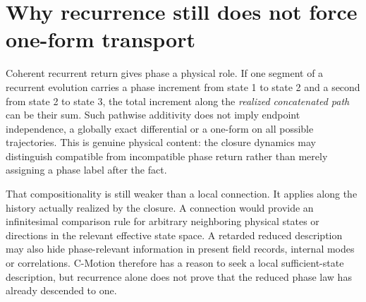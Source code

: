 \documentclass[11pt]{article}
\theoremstyle{definition}
\begin{document}
\section{Why recurrence still does not force one-form transport}
\label{sec:tangent_linearity}

Coherent recurrent return gives phase a physical role.  If one segment of a recurrent evolution carries a phase increment from state 1 to state 2 and a second from state 2 to state 3, the total increment along the \emph{realized concatenated path} can be their sum.  Such pathwise additivity does not imply endpoint independence, a globally exact differential or a one-form on all possible trajectories.  This is genuine physical content: the closure dynamics may distinguish compatible from incompatible phase return rather than merely assigning a phase label after the fact.

That compositionality is still weaker than a local connection.  It applies along the history actually realized by the closure.  A connection would provide an infinitesimal comparison rule for arbitrary neighboring physical states or directions in the relevant effective state space.  A retarded reduced description may also hide phase-relevant information in present field records, internal modes or correlations.  C-Motion therefore has a reason to seek a local sufficient-state description, but recurrence alone does not prove that the reduced phase law has already descended to one.
\end{document}

